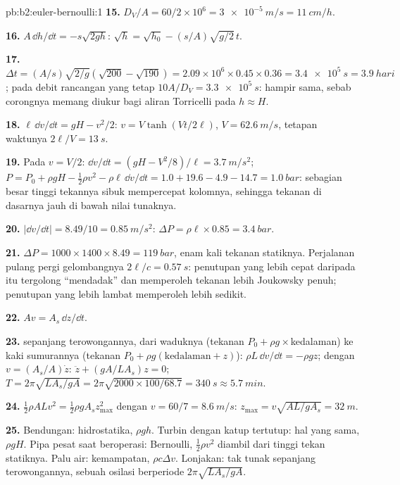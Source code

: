\begin{solution}{pb:b2:euler-bernoulli:1}
\textbf{15.} $D_V/A = 60/2 \times 10^6 = \qty{3e-5}{m/s} = \qty{11}{cm/h}$.

\textbf{16.} $A\,\dd h/\dd t = -s\sqrt{2gh}$: $\sqrt h = \sqrt{h_0} - (s/A)\sqrt{g/2}\,t$.

\textbf{17.} $\Delta t = (A/s)\sqrt{2/g}(\sqrt{200} - \sqrt{190}) = 2.09 \times 10^6 \times
0.45 \times 0.36 = \qty{3.4e5}{s} = \qty{3.9}{hari}$; pada debit rancangan yang tetap
$10A/D_V = \qty{3.3e5}{s}$: hampir sama, sebab corongnya memang diukur
bagi aliran Torricelli pada $h \approx H$.

\textbf{18.} $\ell\,\dd v/\dd t = gH - v^2/2$: $v = V\tanh(Vt/2\ell)$, $V = \qty{62.6}{m/s}$,
tetapan waktunya $2\ell/V = \qty{13}{s}$.

\textbf{19.} Pada $v = V/2$: $\dd v/\dd t = (gH - V^2/8)/\ell = \qty{3.7}{m/s^2}$;
$P = P_0 + \rho gH - \tfrac12\rho v^2 - \rho\ell\,\dd v/\dd t = 1.0 + 19.6 - 4.9 - 14.7
= \qty{1.0}{bar}$: sebagian besar tinggi tekannya sibuk mempercepat kolomnya, sehingga
tekanan di dasarnya jauh di bawah nilai tunaknya.

\textbf{20.} $|\dd v/\dd t| = 8.49/10 = \qty{0.85}{m/s^2}$: $\Delta P = \rho\ell \times 0.85 =
\qty{3.4}{bar}$.

\textbf{21.} $\Delta P = 1000 \times 1400 \times 8.49 = \qty{119}{bar}$, enam kali
tekanan statiknya. Perjalanan pulang pergi gelombangnya $2\ell/c = \qty{0.57}{s}$: penutupan
yang lebih cepat daripada itu tergolong ``mendadak'' dan memperoleh tekanan lebih
Joukowsky penuh; penutupan yang lebih lambat memperoleh lebih sedikit.

\textbf{22.} $Av = A_s\,\dd z/\dd t$.

\textbf{23.}  sepanjang terowongannya, dari waduknya (tekanan
$P_0 + \rho g\times$kedalaman) ke kaki sumurannya (tekanan $P_0 + \rho g
(\text{kedalaman} + z)$): $\rho L\,\dd v/\dd t = -\rho gz$; dengan $v = (A_s/A)\dot z$:
$\ddot z + (gA/LA_s)z = 0$; $T = 2\pi\sqrt{LA_s/gA} = 2\pi\sqrt{2000 \times 100/
68.7} = \qty{340}{s} \approx \qty{5.7}{min}$.

\textbf{24.} $\tfrac12\rho ALv^2 = \tfrac12\rho gA_sz_{\max}^2$ dengan $v = 60/7 =
\qty{8.6}{m/s}$: $z_{\max} = v\sqrt{AL/gA_s} = \qty{32}{m}$.

\textbf{25.} Bendungan: hidrostatika, $\rho gh$. Turbin dengan katup tertutup: hal
yang sama, $\rho gH$. Pipa pesat saat beroperasi: Bernoulli, $\tfrac12\rho v^2$ diambil
dari tinggi tekan statiknya. Palu air: kemampatan, $\rho c\Delta v$.
Lonjakan:  tak tunak sepanjang terowongannya, sebuah osilasi berperiode
$2\pi\sqrt{LA_s/gA}$.
\end{solution}
